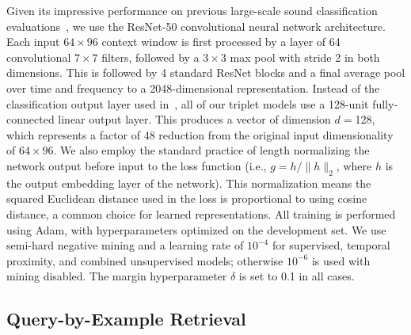 \documentclass{article}
\begin{document}
Given its impressive performance on previous large-scale sound classification
evaluations~\cite{hershey2017cnn}, we use the ResNet-50 convolutional neural
network architecture.  Each input $64\!\times\!96$ context window is first
processed by a layer of 64 convolutional $7\!\times\!7$ filters, followed by a
$3\!\times\!3$ max pool with stride 2 in both dimensions.  This is followed by 4
standard ResNet blocks and a final average pool over time and frequency to a
2048-dimensional representation.  Instead of the classification output layer
used in~\cite{hershey2017cnn}, all of our triplet models use a 128-unit
fully-connected linear output layer. This produces a vector of dimension
$d=$128, which represents a factor of 48 reduction from the original input
dimensionality of $64\!\times\!96$. We also employ the standard practice of
length normalizing the network output before input to the loss function (i.e.,
$g = h/\|h\|_2$, where $h$ is the output embedding layer of the network). This
normalization means the squared Euclidean distance used in the loss is
proportional to using cosine distance, a common choice for learned
representations. All training is performed using Adam, with hyperparameters
optimized on the development set.  We use semi-hard negative mining and a
learning rate of $10^{-4}$ for supervised, temporal proximity, and combined
unsupervised models; otherwise $10^{-6}$ is used with mining disabled.  The
margin hyperparameter $\delta$ is set to 0.1 in all cases.

\subsection{Query-by-Example Retrieval}
\end{document}
